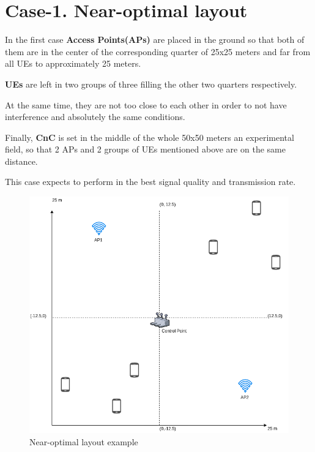 \hypertarget{case-1.-near-optimal-layout}{%
\section{Case-1. Near-optimal layout}\label{case-1.-sub-optimal-layout}}

In the first case \textbf{Access Points(APs)} are placed in the ground
so that both of them are in the center of the corresponding quarter of
25x25 meters and far from all UEs to approximately 25 meters.

\textbf{UEs} are left in two groups of three filling the other two
quarters respectively.

At the same time, they are not too close to each other in order to not
have interference and absolutely the same conditions.

Finally, \textbf{CnC} is set in the middle of the whole 50x50 meters an
experimental field, so that 2 APs and 2 groups of UEs mentioned above
are on the same distance.

This case expects to perform in the best signal quality and transmission
rate.

\begin{figure}[H]
	\centering
	\includegraphics[width=\linewidth,keepaspectratio]{images/05-cases-description-Near-Optimal.png}
\caption{Near-optimal layout example}
\end{figure}
